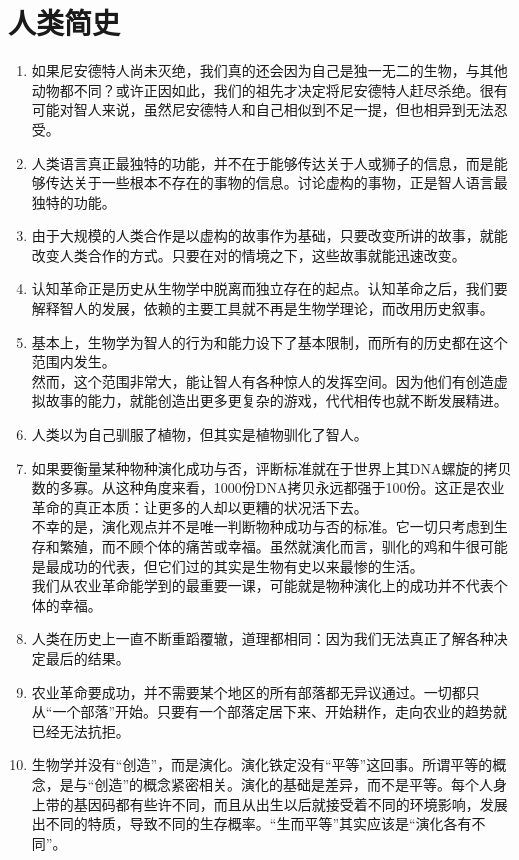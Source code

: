 \documentclass[UTF8]{ctexart}
\begin{document}
	\section{人类简史}
		\begin{enumerate}
			\item 如果尼安德特人尚未灭绝，我们真的还会因为自己是独一无二的生物，与其他动物都不同？或许正因如此，我们的祖先才决定将尼安德特人赶尽杀绝。很有可能对智人来说，虽然尼安德特人和自己相似到不足一提，但也相异到无法忍受。
			\item 人类语言真正最独特的功能，并不在于能够传达关于人或狮子的信息，而是能够传达关于一些根本不存在的事物的信息。讨论虚构的事物，正是智人语言最独特的功能。
			\item 由于大规模的人类合作是以虚构的故事作为基础，只要改变所讲的故事，就能改变人类合作的方式。只要在对的情境之下，这些故事就能迅速改变。
			\item 认知革命正是历史从生物学中脱离而独立存在的起点。认知革命之后，我们要解释智人的发展，依赖的主要工具就不再是生物学理论，而改用历史叙事。
			\item 基本上，生物学为智人的行为和能力设下了基本限制，而所有的历史都在这个范围内发生。\\
			然而，这个范围非常大，能让智人有各种惊人的发挥空间。因为他们有创造虚拟故事的能力，就能创造出更多更复杂的游戏，代代相传也就不断发展精进。
			\item 人类以为自己驯服了植物，但其实是植物驯化了智人。
			\item 如果要衡量某种物种演化成功与否，评断标准就在于世界上其DNA螺旋的拷贝数的多寡。从这种角度来看，1000份DNA拷贝永远都强于100份。这正是农业革命的真正本质：让更多的人却以更糟的状况活下去。\\
			不幸的是，演化观点并不是唯一判断物种成功与否的标准。它一切只考虑到生存和繁殖，而不顾个体的痛苦或幸福。虽然就演化而言，驯化的鸡和牛很可能是最成功的代表，但它们过的其实是生物有史以来最惨的生活。\\
			我们从农业革命能学到的最重要一课，可能就是物种演化上的成功并不代表个体的幸福。
			\item 人类在历史上一直不断重蹈覆辙，道理都相同：因为我们无法真正了解各种决定最后的结果。
			\item	农业革命要成功，并不需要某个地区的所有部落都无异议通过。一切都只从“一个部落”开始。只要有一个部落定居下来、开始耕作，走向农业的趋势就已经无法抗拒。
			\item 生物学并没有“创造”，而是演化。演化铁定没有“平等”这回事。所谓平等的概念，是与“创造”的概念紧密相关。演化的基础是差异，而不是平等。每个人身上带的基因码都有些许不同，而且从出生以后就接受着不同的环境影响，发展出不同的特质，导致不同的生存概率。“生而平等”其实应该是“演化各有不同”。\\

\end{enumerate}
\end{document}
